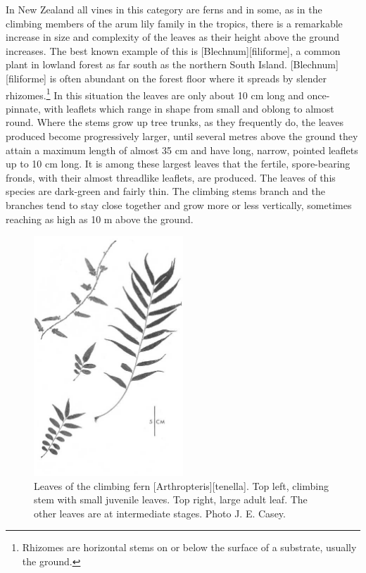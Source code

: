 In New Zealand all vines in this category are ferns and in some, as in the climbing members of the arum lily family in the tropics, there is a remarkable increase in size and complexity of the leaves as their height above the ground increases.
The best known example of this is [Blechnum][filiforme], a common plant in lowland forest as far south as the northern South Island. [Blechnum][filiforme] is often abundant on the forest floor where it spreads by slender rhizomes.\footnote{Rhizomes are horizontal stems on or below the surface of a substrate, usually the ground.}
In this situation the leaves are only about 10 cm long and once-pinnate, with leaflets which range in shape from small and oblong to almost round.
Where the stems grow up tree trunks, as they frequently do, the leaves produced become progressively larger, until several metres above the ground they attain a maximum length of almost 35 cm and have long, narrow, pointed leaflets up to 10 cm long.
It is among these largest leaves that the fertile, spore-bearing fronds, with their almost threadlike leaflets, are produced.
The leaves of this species are dark-green and fairly thin.
The climbing stems branch and the branches tend to stay close together and grow more or less vertically, sometimes reaching as high as 10 m above the ground.

\begin{figure}
	\includegraphics[width=0.5\textwidth]{graphics/figure28fern.jpg}
	\centering
	\caption[Leaves of the climbing fern \emph{Arthropteris tenella}]{Leaves of the climbing fern [Arthropteris][tenella].
	Top left, climbing stem with small juvenile leaves.
	Top right, large adult leaf.
	The other leaves are at intermediate stages.
	Photo  J. E. Casey.}%
	\label{fig:28fern}
\end{figure}

